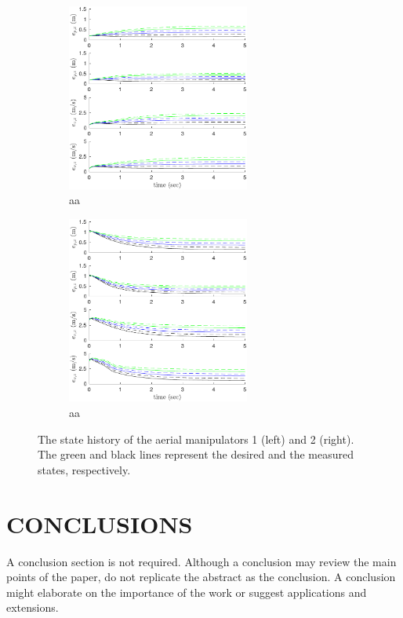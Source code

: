\documentclass[letterpaper, 10 pt, conference]{ieeeconf}  %
\begin{document}
\begin{figure}[h]
\begin{subfigure}[b]{0.5\textwidth}
\centering
\includegraphics[width=6.0cm]{smaller.pdf}
\caption{aa}
\end{subfigure}
\begin{subfigure}[b]{0.5\textwidth}
\centering
\includegraphics[width=6.0cm]{bigger.pdf}
\caption{aa}
\end{subfigure}

\caption{
The state history of the aerial manipulators 1 (left) and 2 (right). The green and black lines represent the desired and the measured states, respectively.}
\label{fig:am1State}
\end{figure}



\section{CONCLUSIONS}

A conclusion section is not required. Although a conclusion may review the main points of the paper, do not replicate the abstract as the conclusion. A conclusion might elaborate on the importance of the work or suggest applications and extensions. 

\addtolength{\textheight}{-12cm}   %
\end{document}
